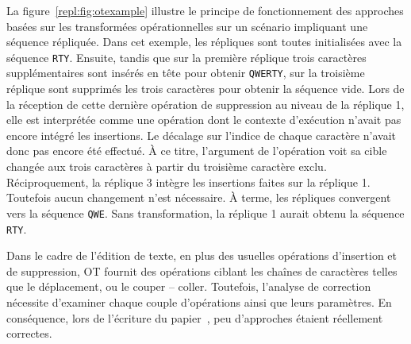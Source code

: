 La figure~\ref{repl:fig:otexample} illustre le principe de fonctionnement des
approches basées sur les transformées opérationnelles sur un scénario impliquant
une séquence répliquée. Dans cet exemple, les répliques sont toutes initialisées
avec la séquence \texttt{RTY}. Ensuite, tandis que sur la première réplique
trois caractères supplémentaires sont insérés en tête pour obtenir
\texttt{QWERTY}, sur la troisième réplique sont supprimés les trois caractères
pour obtenir la séquence vide. Lors de la réception de cette dernière opération
de suppression au niveau de la réplique 1, elle est interprétée comme une
opération dont le contexte d'exécution n'avait pas encore intégré les
insertions. Le décalage sur l'indice de chaque caractère n'avait donc pas encore
été effectué. À ce titre, l'argument de l'opération voit sa cible changée aux
trois caractères à partir du troisième caractère exclu. Réciproquement, la
réplique 3 intègre les insertions faites sur la réplique 1. Toutefois aucun
changement n'est nécessaire. À terme, les répliques convergent vers la séquence
\texttt{QWE}. Sans transformation, la réplique 1 aurait obtenu la séquence
\texttt{RTY}.

Dans le cadre de l'édition de texte, en plus des usuelles opérations d'insertion
et de suppression, OT fournit des opérations ciblant les chaînes de caractères
telles que le déplacement, ou le couper -- coller. Toutefois, l'analyse de
correction nécessite d'examiner chaque couple d'opérations ainsi que leurs
paramètres. En conséquence, lors de l'écriture du
papier~\cite{imine2003proving}, peu d'approches étaient réellement correctes.


